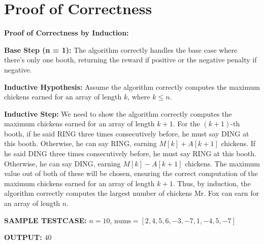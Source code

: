 \documentclass{article}
\begin{document}
\section{Proof of Correctness}

\textbf{Proof of Correctness by Induction:}

\textbf{Base Step (n = 1):}
The algorithm correctly handles the base case where there's only one booth, returning the reward if positive or the negative penalty if negative.

\textbf{Inductive Hypothesis:}
Assume the algorithm correctly computes the maximum chickens earned for an array of length $k$, where $k \leq n$.

\textbf{Inductive Step:}
We need to show the algorithm correctly computes the maximum chickens earned for an array of length $k + 1$.
For the $(k+1)$-th booth, if he said RING three times consecutively before, he must say DING at this booth. Otherwise, he can say RING, earning $M[k] + A[k+1]$ chickens. If he said DING three times consecutively before, he must say RING at this booth. Otherwise, he can say DING, earning $M[k] - A[k+1]$ chickens.
The maximum value out of both of these will be chosen, ensuring the correct computation of the maximum chickens earned for an array of length $k + 1$.
Thus, by induction, the algorithm correctly computes the largest number of chickens Mr. Fox can earn for an array of length $n$.

\textbf{SAMPLE TESTCASE:}
$n=10$, $\text{nums}=[2, 4, 5, 6, -3, -7, 1, -4, 5, -7]$

\textbf{OUTPUT:} $40$
\end{document}
